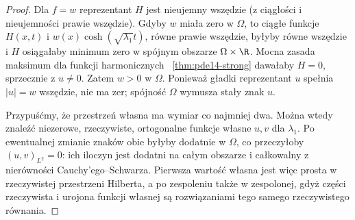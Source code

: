\begin{proof}
Dla $f=w$ reprezentant $H$ jest nieujemny wszędzie
(z ciągłości i nieujemności prawie wszędzie).
Gdyby $w$ miała zero w $\Omega$, to ciągłe funkcje
$H(x,t)$ i $w(x)\cosh(\sqrt{\lambda_1}t)$, równe
prawie wszędzie, byłyby równe wszędzie i $H$ osiągałaby
minimum zero w spójnym obszarze $\Omega\times\R$.
Mocna zasada maksimum dla funkcji harmonicznych
~\ref{thm:pde14-strong} dawałaby $H=0$, sprzecznie
z $u\ne0$. Zatem $w>0$ w $\Omega$.
Ponieważ gładki reprezentant $u$ spełnia $|u|=w$
wszędzie, nie ma zer; spójność $\Omega$ wymusza
stały znak $u$.

Przypuśćmy, że przestrzeń własna ma wymiar co najmniej dwa.
Można wtedy znaleźć niezerowe, rzeczywiste, ortogonalne
funkcje własne $u,v$ dla $\lambda_1$.
Po ewentualnej zmianie znaków obie byłyby dodatnie w $\Omega$,
co przeczyłoby $(u,v)_{L^2}=0$: ich iloczyn jest
dodatni na całym obszarze i całkowalny z nierówności
Cauchy'ego--Schwarza. Pierwsza wartość własna jest
więc prosta w rzeczywistej przestrzeni Hilberta,
a po zespoleniu także w zespolonej, gdyż części
rzeczywista i urojona funkcji własnej są rozwiązaniami
tego samego rzeczywistego równania.
\end{proof}

